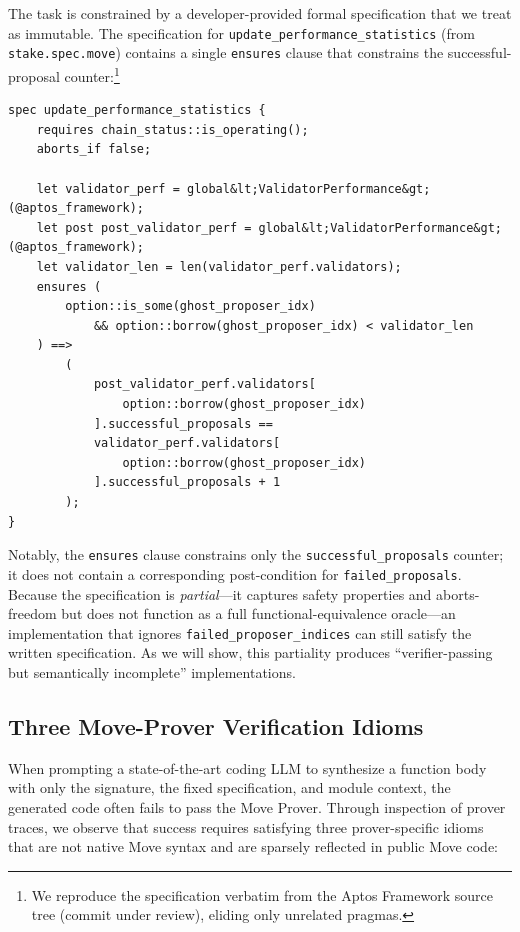 The task is constrained by a developer-provided formal specification that we treat as immutable.
The specification for \texttt{update\_performance\_statistics} (from \texttt{stake.spec.move}) contains a single \texttt{ensures} clause that constrains the successful-proposal counter:\footnote{We reproduce the specification verbatim from the Aptos Framework source tree (commit under review), eliding only unrelated pragmas.}
\begin{lstlisting}[language=Move,basicstyle=\small\ttfamily]
spec update_performance_statistics {
    requires chain_status::is_operating();
    aborts_if false;

    let validator_perf = global&lt;ValidatorPerformance&gt;(@aptos_framework);
    let post post_validator_perf = global&lt;ValidatorPerformance&gt;(@aptos_framework);
    let validator_len = len(validator_perf.validators);
    ensures (
        option::is_some(ghost_proposer_idx)
            && option::borrow(ghost_proposer_idx) < validator_len
    ) ==>
        (
            post_validator_perf.validators[
                option::borrow(ghost_proposer_idx)
            ].successful_proposals ==
            validator_perf.validators[
                option::borrow(ghost_proposer_idx)
            ].successful_proposals + 1
        );
}
\end{lstlisting}
Notably, the \texttt{ensures} clause constrains only the \texttt{successful\_proposals} counter; it does not contain a corresponding post-condition for \texttt{failed\_proposals}.
Because the specification is \emph{partial}---it captures safety properties and aborts-freedom but does not function as a full functional-equivalence oracle---an implementation that ignores \texttt{failed\_proposer\_indices} can still satisfy the written specification.
As we will show, this partiality produces ``verifier-passing but semantically incomplete'' implementations.

\subsection{Three Move-Prover Verification Idioms}\label{subsec:three-idioms}

When prompting a state-of-the-art coding LLM to synthesize a function body with only the signature, the fixed specification, and module context, the generated code often fails to pass the Move Prover.
Through inspection of prover traces, we observe that success requires satisfying three prover-specific idioms that are not native Move syntax and are sparsely reflected in public Move code:

